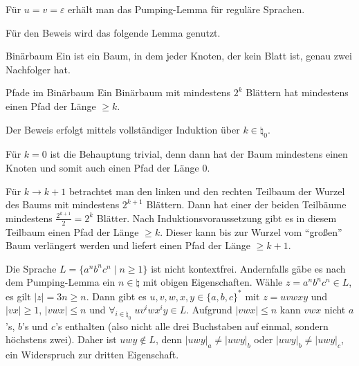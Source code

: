\begin{Bem}
    Für $u = v = \varepsilon$ erhält man das Pumping-Lemma für
    reguläre Sprachen.
\end{Bem}

\linie
\pagebreak

\begin{Bem}
    Für den Beweis wird das folgende Lemma genutzt.
\end{Bem}

\begin{Def}{Binärbaum}
    Ein  ist ein Baum, in dem jeder Knoten,
    der kein Blatt ist, genau zwei Nachfolger hat.
\end{Def}

\begin{Lemma}{Pfade im Binärbaum}
    Ein Binärbaum mit mindestens $2^k$ Blättern hat mindestens einen Pfad der
    Länge $\ge k$.
\end{Lemma}

\begin{Beweis}
    Der Beweis erfolgt mittels vollständiger Induktion
    über $k \in \natural_0$.
    
    Für $k = 0$ ist die Behauptung trivial, denn dann hat der Baum mindestens
    einen Knoten und somit auch einen Pfad der Länge $0$.
    
    Für $k \to k + 1$ betrachtet man den linken und den rechten Teilbaum der
    Wurzel des Baums mit mindestens $2^{k+1}$ Blättern.
    Dann hat einer der beiden Teilbäume mindestens $\frac{2^{k+1}}{2} = 2^k$
    Blätter.
    Nach Induktionsvoraussetzung gibt es in diesem Teilbaum einen Pfad der
    Länge $\ge k$.
    Dieser kann bis zur Wurzel vom "`großen"' Baum verlängert werden und
    liefert einen Pfad der Länge $\ge k + 1$.
\end{Beweis}

\linie

\begin{Bsp}
    Die Sprache $L = \{a^n b^n c^n \;|\; n \ge 1\}$ ist nicht kontextfrei.
    Andernfalls gäbe es nach dem Pumping-Lemma ein $n \in \natural$ mit
    obigen Eigenschaften.
    Wähle $z = a^n b^n c^n \in L$,
    es gilt $|z| = 3n \ge n$.
    Dann gibt es $u, v, w, x, y \in \{a, b, c\}^\ast$ mit $z = uvwxy$ und
    $|vx| \ge 1$, $|vwx| \le n$ und
    $\forall_{i \in \natural_0}\; uv^iwx^iy \in L$.
    Aufgrund $|vwx| \le n$ kann $vwx$ nicht $a$'s, $b$'s und $c$'s enthalten
    (also nicht alle drei Buchstaben auf einmal, sondern höchstens zwei).
    Daher ist $uwy \notin L$, denn
    $|uwy|_a \not= |uwy|_b$ oder
    $|uwy|_b \not= |uwy|_c$, ein Widerspruch zur dritten Eigenschaft.
\end{Bsp}

